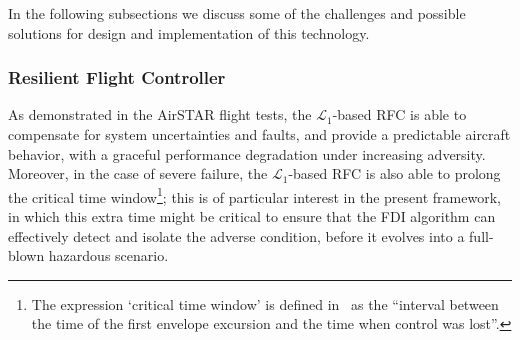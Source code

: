 \documentclass[letter,onecolumn,12pt]{aiaa-tc}
\newcommand{\Lone}{\mathcal{L}_1}
\begin{document}
%

In the following subsections we discuss some of the challenges and possible solutions for design and implementation of this technology.


\subsubsection{Resilient Flight Controller}

As demonstrated in the AirSTAR flight tests, the $\Lone$-based RFC is able to compensate for system uncertainties and faults, and provide a predictable aircraft behavior, with a graceful performance degradation under increasing adversity. Moreover, in the case of severe failure, the $\Lone$-based RFC is also able to prolong the critical time window\footnote{The expression `critical time window' is defined in~\cite{LOC04_LOCMetrics} as the ``interval between the time of the first envelope excursion and the time when control was lost''.}; this is of particular interest in the present framework, in which this extra time might be critical to ensure that the FDI algorithm can effectively detect and isolate the adverse condition, before it evolves into a full-blown hazardous scenario.
\end{document}
